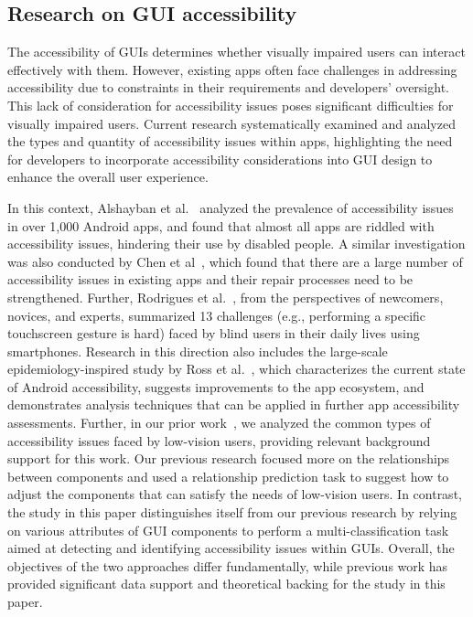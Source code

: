\subsection{Research on GUI accessibility}

The accessibility of GUIs determines whether visually impaired users can interact effectively with them.
However, existing apps often face challenges in addressing accessibility due to constraints in their requirements and developers' oversight. 
This lack of consideration for accessibility issues poses significant difficulties for visually impaired users. 
Current research systematically examined and analyzed the types and quantity of accessibility issues within apps, highlighting the need for developers to incorporate accessibility considerations into GUI design to enhance the overall user experience. 

In this context, Alshayban et al.~\citep{Alshayban2020AccessibilityII} analyzed the prevalence of accessibility issues in over 1,000 Android apps, and found that almost all apps are riddled with accessibility issues, hindering their use by disabled people. 
A similar investigation was also conducted by Chen et al~\citep{Chen2021AccessibleON}, which found that there are a large number of accessibility issues in existing apps and their repair processes need to be strengthened.
Further, Rodrigues et al.~\citep{Rodrigues2020OpenCO}, from the perspectives of newcomers, novices, and experts, summarized 13 challenges (e.g., performing a specific touchscreen gesture is hard) faced by blind users in their daily lives using smartphones.
Research in this direction also includes the large-scale epidemiology-inspired study by Ross et al.~\citep{Ross2020AnEL}, which characterizes the current state of Android accessibility, suggests improvements to the app ecosystem, and demonstrates analysis techniques that can be applied in further app accessibility assessments.
Further, in our prior work~\cite{10338828}, we analyzed the common types of accessibility issues faced by low-vision users, providing relevant background support for this work. 
Our previous research focused more on the relationships between components and used a relationship prediction task to suggest how to adjust the components that can satisfy the needs of low-vision users.
In contrast, the study in this paper distinguishes itself from our previous research by relying on various attributes of GUI components to perform a multi-classification task aimed at detecting and identifying accessibility issues within GUIs.
Overall, the objectives of the two approaches differ fundamentally, while previous work has provided significant data support and theoretical backing for the study in this paper.


